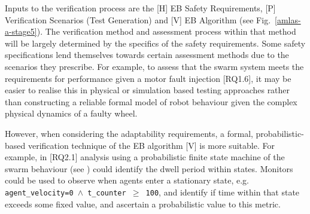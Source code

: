 \documentclass[runningheads]{llncs}
\begin{document}

Inputs to the verification process are the [H] EB Safety Requirements, [P] Verification Scenarios (Test Generation) and [V] EB Algorithm (see Fig.~\ref{amlas-a-stage5}). 
%
The verification method and assessment process within that method will be largely determined by the specifics of the safety requirements. Some safety specifications lend themselves towards certain assessment methods due to the scenarios they prescribe.
%
For example, to assess that the swarm system meets the requirements for performance given a motor fault injection [RQ1.6], it may be easier to realise this in physical or simulation based testing approaches rather than constructing a reliable formal model of robot behaviour given the complex physical dynamics of a faulty wheel.

%
However, when considering the adaptability requirements, a formal, probabilistic-based verification technique of the EB algorithm [V] is more suitable. For example, in [RQ2.1] analysis using a probabilistic finite state machine of the swarm behaviour (see \cite{Hoffmann2016,Calinescu2018}) could identify the dwell period within states. Monitors could be used to observe when agents enter a stationary state, e.g. \texttt{agent\_velocity=0 $\land $  t\_counter  $\ge$ 100}, and identify if time within that state exceeds some fixed value, and ascertain a probabilistic value to this metric.
%
\end{document}
